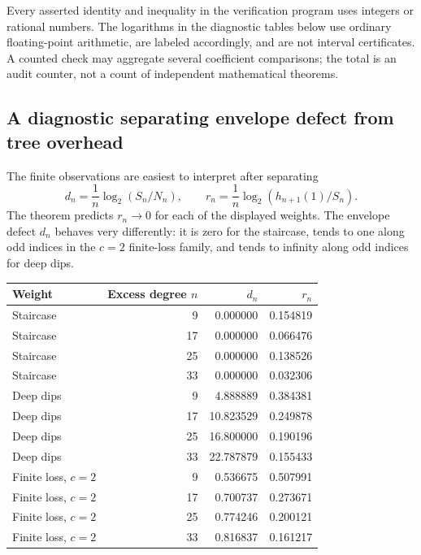 \documentclass[11pt,a4paper]{article}
\numberwithin{equation}{section}
\theoremstyle{definition}
\theoremstyle{remark}
\begin{document}
Every asserted identity and inequality in the verification program uses
integers or rational numbers. The logarithms in the diagnostic tables
below use ordinary floating-point arithmetic, are labeled accordingly,
and are not interval certificates. A counted check may aggregate several
coefficient comparisons; the total is an audit counter, not a count of
independent mathematical theorems.

\subsection{A diagnostic separating envelope defect from tree overhead}

The finite observations are easiest to interpret after separating
\begin{equation}
 d_n=\frac1n\log_2(S_n/N_n),\qquad
 r_n=\frac1n\log_2(h_{n+1}(1)/S_n).
 \label{eq:diagnostics}
\end{equation}
The theorem predicts $r_n\to0$ for each of the displayed weights.
The envelope defect $d_n$ behaves very differently: it is zero for the
staircase, tends to one along odd indices in the $c=2$ finite-loss
family, and tends to infinity along odd indices for deep dips.

\begin{center}
\small
\begin{tabular}{@{}lrrr@{}}
\toprule
Weight & Excess degree $n$ & $d_n$ & $r_n$\\
\midrule
Staircase & 9 & 0.000000 & 0.154819\\
Staircase & 17 & 0.000000 & 0.066476\\
Staircase & 25 & 0.000000 & 0.138526\\
Staircase & 33 & 0.000000 & 0.032306\\
\addlinespace
Deep dips & 9 & 4.888889 & 0.384381\\
Deep dips & 17 & 10.823529 & 0.249878\\
Deep dips & 25 & 16.800000 & 0.190196\\
Deep dips & 33 & 22.787879 & 0.155433\\
\addlinespace
Finite loss, $c=2$ & 9 & 0.536675 & 0.507991\\
Finite loss, $c=2$ & 17 & 0.700737 & 0.273671\\
Finite loss, $c=2$ & 25 & 0.774246 & 0.200121\\
Finite loss, $c=2$ & 33 & 0.816837 & 0.161217\\
\bottomrule
\end{tabular}
\end{center}
\end{document}
